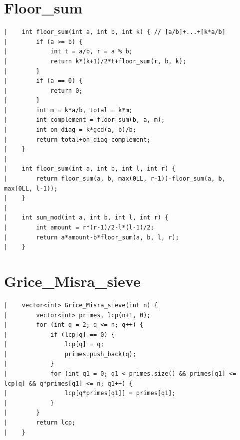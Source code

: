 \documentclass[a4paper, 10pt]{article}
\begin{document}
\begin{center}
\section*{Floor\_sum}
\begin{verbatim}
|    int floor_sum(int a, int b, int k) { // [a/b]+...+[k*a/b]
|        if (a >= b) {
|            int t = a/b, r = a % b;
|            return k*(k+1)/2*t+floor_sum(r, b, k);
|        }
|        if (a == 0) {
|            return 0;
|        }
|        int m = k*a/b, total = k*m;
|        int complement = floor_sum(b, a, m);
|        int on_diag = k*gcd(a, b)/b;
|        return total+on_diag-complement;
|    }
|    
|    int floor_sum(int a, int b, int l, int r) {
|        return floor_sum(a, b, max(0LL, r-1))-floor_sum(a, b, max(0LL, l-1));
|    }
|    
|    int sum_mod(int a, int b, int l, int r) {
|        int amount = r*(r-1)/2-l*(l-1)/2;
|        return a*amount-b*floor_sum(a, b, l, r);
|    }
\end{verbatim}

\section*{Grice\_Misra\_sieve}
\begin{verbatim}
|    vector<int> Grice_Misra_sieve(int n) {
|        vector<int> primes, lcp(n+1, 0);
|        for (int q = 2; q <= n; q++) {
|            if (lcp[q] == 0) {
|                lcp[q] = q;
|                primes.push_back(q);
|            }
|            for (int q1 = 0; q1 < primes.size() && primes[q1] <= lcp[q] && q*primes[q1] <= n; q1++) {
|                lcp[q*primes[q1]] = primes[q1];
|            }
|        }
|        return lcp;
|    }
\end{verbatim}


\end{center}
\end{document}
